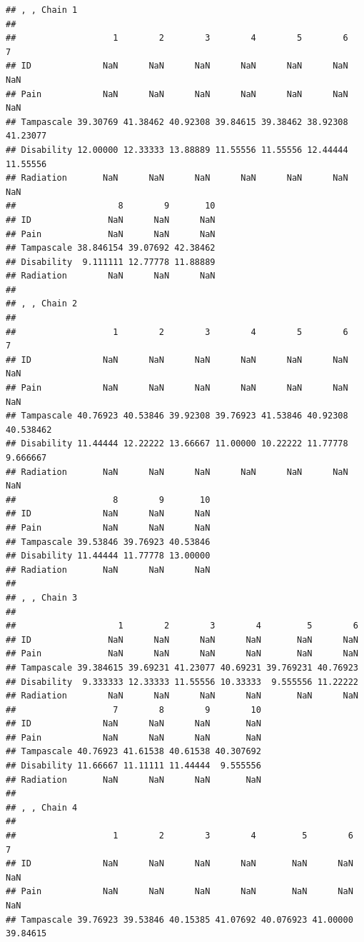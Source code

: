 \documentclass[]{book}
\theoremstyle{definition}
\theoremstyle{definition}
\theoremstyle{definition}
\theoremstyle{remark}
\begin{document}
\begin{verbatim}
## , , Chain 1
## 
##                   1        2        3        4        5        6        7
## ID              NaN      NaN      NaN      NaN      NaN      NaN      NaN
## Pain            NaN      NaN      NaN      NaN      NaN      NaN      NaN
## Tampascale 39.30769 41.38462 40.92308 39.84615 39.38462 38.92308 41.23077
## Disability 12.00000 12.33333 13.88889 11.55556 11.55556 12.44444 11.55556
## Radiation       NaN      NaN      NaN      NaN      NaN      NaN      NaN
##                    8        9       10
## ID               NaN      NaN      NaN
## Pain             NaN      NaN      NaN
## Tampascale 38.846154 39.07692 42.38462
## Disability  9.111111 12.77778 11.88889
## Radiation        NaN      NaN      NaN
## 
## , , Chain 2
## 
##                   1        2        3        4        5        6         7
## ID              NaN      NaN      NaN      NaN      NaN      NaN       NaN
## Pain            NaN      NaN      NaN      NaN      NaN      NaN       NaN
## Tampascale 40.76923 40.53846 39.92308 39.76923 41.53846 40.92308 40.538462
## Disability 11.44444 12.22222 13.66667 11.00000 10.22222 11.77778  9.666667
## Radiation       NaN      NaN      NaN      NaN      NaN      NaN       NaN
##                   8        9       10
## ID              NaN      NaN      NaN
## Pain            NaN      NaN      NaN
## Tampascale 39.53846 39.76923 40.53846
## Disability 11.44444 11.77778 13.00000
## Radiation       NaN      NaN      NaN
## 
## , , Chain 3
## 
##                    1        2        3        4         5        6
## ID               NaN      NaN      NaN      NaN       NaN      NaN
## Pain             NaN      NaN      NaN      NaN       NaN      NaN
## Tampascale 39.384615 39.69231 41.23077 40.69231 39.769231 40.76923
## Disability  9.333333 12.33333 11.55556 10.33333  9.555556 11.22222
## Radiation        NaN      NaN      NaN      NaN       NaN      NaN
##                   7        8        9        10
## ID              NaN      NaN      NaN       NaN
## Pain            NaN      NaN      NaN       NaN
## Tampascale 40.76923 41.61538 40.61538 40.307692
## Disability 11.66667 11.11111 11.44444  9.555556
## Radiation       NaN      NaN      NaN       NaN
## 
## , , Chain 4
## 
##                   1        2        3        4         5        6        7
## ID              NaN      NaN      NaN      NaN       NaN      NaN      NaN
## Pain            NaN      NaN      NaN      NaN       NaN      NaN      NaN
## Tampascale 39.76923 39.53846 40.15385 41.07692 40.076923 41.00000 39.84615

\end{verbatim}
\end{document}
